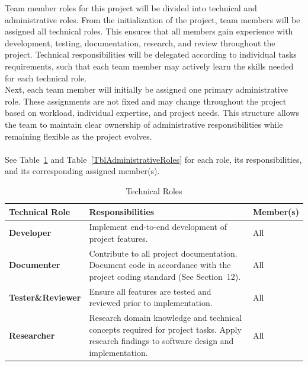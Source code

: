 \documentclass{article}
\begin{document}
Team member roles for this project will be divided into technical and administrative roles.
From the initialization of the project, team members will be assigned all technical roles. This ensures that all members gain experience with development, testing, documentation, research, and review throughout the project. Technical responsibilities will be delegated according to individual tasks requirements, such that each team member may actively learn the skills needed for each technical role.
\\Next, each team member will initially be assigned one primary administrative role. These assignments are not fixed and may change throughout the project based on workload, individual expertise, and project needs. This structure allows the team to maintain clear ownership of administrative responsibilities while remaining flexible as the project evolves.
\\\\See Table~\ref{TblTechnicalRoles} and Table~\ref{TblAdministrativeRoles} for each role, its responsibilities, and its corresponding assigned member(s).

\begin{table}[H]
    \caption{Technical Roles}\label{TblTechnicalRoles}
    \renewcommand{\arraystretch}{1.1}
    \setlength{\tabcolsep}{5pt}
    \begin{tabularx}{\textwidth}{p{3cm} X p{3cm}}
    \toprule
    \textbf{Technical Role} & \textbf{Responsibilities} & \textbf{Member(s)}\\
    \midrule

    \textbf{Developer}
    & Implement end-to-end development of project features.
    & All
    \\
    \midrule

    \textbf{Documenter}
    & Contribute to all project documentation. Document code in accordance with the project coding standard (See Section~12).
    & All
    \\
    \midrule

    \textbf{Tester\&Reviewer}
    & Ensure all features are tested and reviewed prior to implementation.
    & All
    \\
    \midrule

    \textbf{Researcher}
    & Research domain knowledge and technical concepts required for project tasks. Apply research findings to software design and implementation.
    & All
    \\

    \bottomrule
    \end{tabularx}
\end{table}
\end{document}

